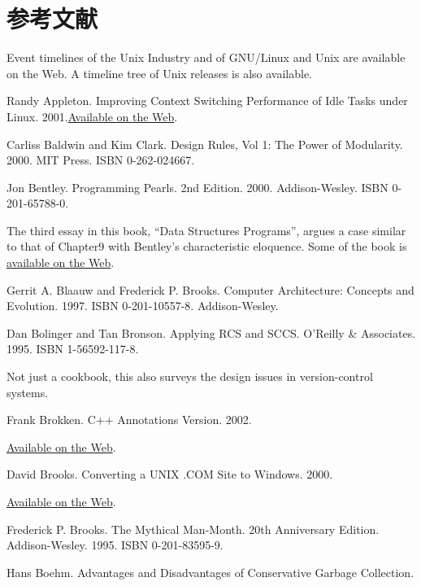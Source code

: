 \documentclass[12pt,oneside]{book}
\begin{document}
\backmatter
\section{参考文献}

Event timelines of the Unix Industry and of GNU/Linux and Unix are available on the Web. A timeline tree of Unix releases is also available.

\begin{thebibliography}{9}
 Randy Appleton. Improving Context Switching Performance of Idle Tasks under Linux. 2001.\href{http://euclid.nmu.edu/~randy/Research/Papers/Scheduler/}{Available on the Web}.

 Carliss Baldwin and Kim Clark. Design Rules, Vol 1: The Power of Modularity. 2000. MIT Press. ISBN 0-262-024667.

 Jon Bentley. Programming Pearls. 2nd Edition. 2000. Addison-Wesley. ISBN 0-201-65788-0.

The third essay in this book, “Data Structures Programs”, argues a case similar to that of Chapter9 with Bentley's characteristic eloquence. Some of the book is \href{http://www.cs.bell-labs.com/cm/cs/pearls/}{available on the Web}.

 Gerrit A. Blaauw and Frederick P. Brooks. Computer Architecture: Concepts and Evolution. 1997. ISBN 0-201-10557-8. Addison-Wesley.

 Dan Bolinger and Tan Bronson. Applying RCS and SCCS. O'Reilly \&{} Associates. 1995. ISBN 1-56592-117-8.

Not just a cookbook, this also surveys the design issues in version-control systems.

 Frank Brokken. C++ Annotations Version. 2002.

\href{http://www.icce.rug.nl/documents/cplusplus/cplusplus.html}{Available on the Web}.

 David Brooks. Converting a UNIX .COM Site to Windows. 2000.

\href{http://www.securityoffice.net/mssecrets/hotmail.html#_Toc491601819}{Available on the Web}.

 Frederick P. Brooks. The Mythical Man-Month. 20th Anniversary Edition. Addison-Wesley. 1995. ISBN 0-201-83595-9.

 Hans Boehm. Advantages and Disadvantages of Conservative Garbage Collection.


\end{thebibliography}
\end{document}
